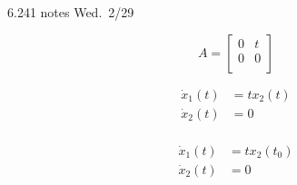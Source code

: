 \begin{example}
  6.241 notes Wed.\ 2/29

  \begin{equation*}
    A=
    \left[
      \begin{array}{cc}
        0 & t \\
        0 & 0 \\
      \end{array}
    \right]
  \end{equation*}

  \begin{equation*}
    \begin{split}
      \dot{x}_{1}(t)&=tx_{2}(t) \\
      \dot{x}_{2}(t)&=0 \\
    \end{split}
  \end{equation*}

  \begin{equation*}
  \begin{split}
      \dot{x}_{1}(t)&=tx_{2}(t_{0}) \\
      \dot{x}_{2}(t)&=0 \\
    \end{split}
  \end{equation*}
\end{example}

